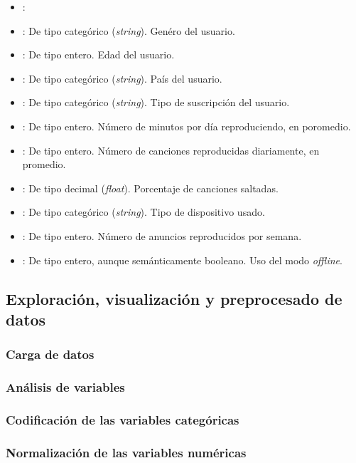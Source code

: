     \begin{itemize}
        \item {}:
        \item {}: De tipo categórico (\textit{string}). Genéro del usuario.
        \item {}: De tipo entero. Edad del usuario.
        \item {}: De tipo categórico (\textit{string}). País del usuario. 
        \item {}: De tipo categórico (\textit{string}). Tipo de suscripción del usuario.
        \item {}: De tipo entero. Número de minutos por día reproduciendo, en poromedio. 
        \item {}: De tipo entero. Número de canciones reproducidas diariamente, en promedio.
        \item {}: De tipo decimal (\textit{float}). Porcentaje de canciones saltadas. 
        \item {}: De tipo categórico (\textit{string}). Tipo de dispositivo usado. 
        \item {}: De tipo entero. Número de anuncios reproducidos por semana.
        \item {}: De tipo entero, aunque semánticamente booleano. Uso del modo \textit{offline}. 
    \end{itemize}


\subsection{Exploración, visualización y preprocesado de datos}

\subsubsection{Carga de datos}


\subsubsection{Análisis de variables}


\subsubsection{Codificación de las variables categóricas}


\subsubsection{Normalización de las variables numéricas}

